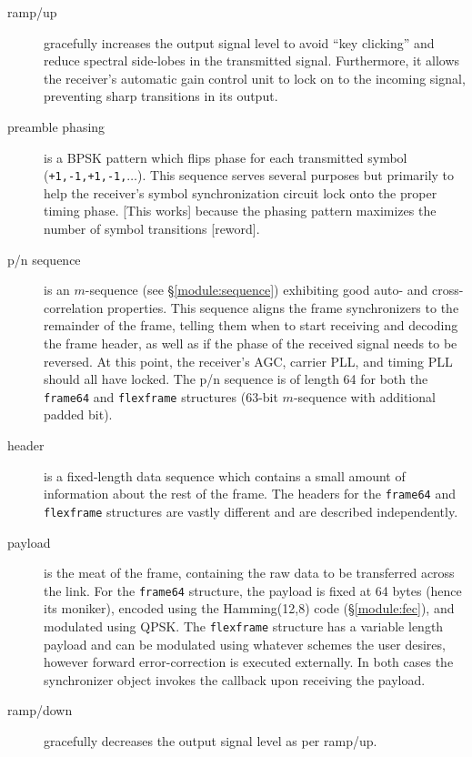 \begin{description}
\item[{\sf ramp/up}]
    gracefully increases the output signal level to avoid ``key clicking'' and
    reduce spectral side-lobes in the transmitted signal.
    Furthermore, it allows the receiver's automatic gain control unit to
    lock on to the incoming signal, preventing sharp transitions in its
    output.
\item[{\sf preamble phasing}]
    is a BPSK pattern which flips phase for each transmitted symbol
    ({\tt +1,-1,+1,-1,$\ldots$}).
    This sequence serves several purposes but primarily to help the receiver's
    symbol synchronization circuit lock onto the proper timing phase.
    [This works] because the phasing pattern maximizes the number of symbol
    transitions [reword].
\item[{\sf p/n sequence}]
    is an $m$-sequence (see \S\ref{module:sequence}) exhibiting good
    auto- and cross-correlation properties.
    This sequence aligns the frame synchronizers to the remainder of the
    frame, telling them when to start receiving and decoding the frame header,
    as well as if the phase of the received signal needs to be reversed.
    At this point, the receiver's AGC, carrier PLL, and timing PLL should all
    have locked.
    The p/n sequence is of length 64 for both the {\tt frame64} and
    {\tt flexframe} structures (63-bit $m$-sequence with additional padded
    bit).
\item[{\sf header}]
    is a fixed-length data sequence which contains a small amount of
    information about the rest of the frame.
    The headers for the {\tt frame64} and {\tt flexframe} structures are
    vastly different and are described independently.
\item[{\sf payload}]
    is the meat of the frame, containing the raw data to be transferred across
    the link.
    For the {\tt frame64} structure, the payload is fixed at 64 bytes (hence
    its moniker), encoded using the Hamming(12,8) code
    (\S\ref{module:fec}), and modulated using QPSK.
    The {\tt flexframe} structure has a variable length payload and can be
    modulated using whatever schemes the user desires, however forward
    error-correction is executed externally.
    In both cases the synchronizer object invokes the callback upon receiving
    the payload.
\item[{\sf ramp/down}]
    gracefully decreases the output signal level as per ramp/up.
\end{description}


